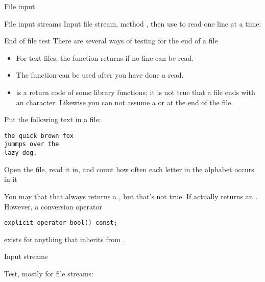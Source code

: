  {File input}

\begin{block}{File input streams}
  \label{sl:filein}
  Input file stream, method , then use
   to read one line at a time:
\end{block}

\begin{block}{End of file test}
  There are several ways of testing for the end of a file
  \begin{itemize}
  \item For text files, the  function returns
     if no line can be read.
  \item The  function can be used after you have done
    a read.
  \item {} is a return code of some library
    functions; it is not true that a file ends with an 
    character.
    Likewise you can not assume a
     or  at the end of the file.
  \end{itemize}
\end{block}

\begin{exercise}
  \label{ex:foxcount}
  Put the following text in a file:
\begin{verbatim}
the quick brown fox
jummps over the
lazy dog.
\end{verbatim}
  Open the file, read it in, and count how often each letter in the
  alphabet occurs in it
\end{exercise}

\begin{advanced}
  You may that that  always returns a , but that's
  not true. If actually returns an . However, a conversion operator
\begin{verbatim}
explicit operator bool() const;
\end{verbatim}
  exists for anything that inherits from .
\end{advanced}

 {Input streams}

Test, mostly for file streams:  


